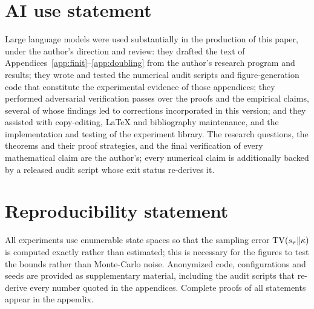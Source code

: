 \documentclass{article}
\theoremstyle{definition}
\theoremstyle{remark}
\begin{document}
\section*{AI use statement}
Large language models were used substantially in the production of this paper, under
the author's direction and review: they drafted the text of
Appendices~\ref{app:finit}--\ref{app:doubling} from the author's research program and
results; they wrote and tested the numerical audit scripts and figure-generation code
that constitute the experimental evidence of those appendices; they performed
adversarial verification passes over the proofs and the empirical claims, several of
whose findings led to corrections incorporated in this version; and they assisted with
copy-editing, \LaTeX{} and bibliography maintenance, and the implementation and
testing of the experiment library. The research questions, the theorems and their
proof strategies, and the final verification of every mathematical claim are the
author's; every numerical claim is additionally backed by a released audit script
whose exit status re-derives it.

\section*{Reproducibility statement}
All experiments use enumerable state spaces so that the sampling error
$\mathrm{TV}(s_\tau \| \kappa)$ is computed exactly rather than estimated; this is
necessary for the figures to test the bounds rather than Monte-Carlo noise.
Anonymized code, configurations and seeds are provided as supplementary material,
including the audit scripts that re-derive every number quoted in the appendices.
Complete proofs of all statements appear in the appendix.











%
\end{document}
